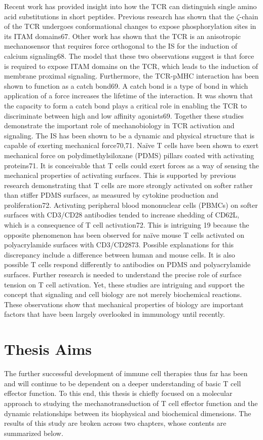 Recent work has provided insight into how the TCR can distinguish
single amino acid substitutions in short peptides. Previous research has
shown that the $\zeta$-chain of the TCR undergoes conformational changes to
expose phosphorylation sites in its ITAM domains67. Other work has shown
that the TCR is an anisotropic mechanosensor that requires force orthogonal
to the IS for the induction of calcium signaling68. The model that these two
observations suggest is that force is required to expose ITAM domains on the
TCR, which leads to the induction of membrane proximal signaling.
Furthermore, the TCR-pMHC interaction has been shown to function as a
catch bond69. A catch bond is a type of bond in which application of a force
increases the lifetime of the interaction. It was shown that the capacity to form
a catch bond plays a critical role in enabling the TCR to discriminate between
high and low affinity agonists69. Together these studies demonstrate the
important role of mechanobiology in TCR activation and signaling.
The IS has been shown to be a dynamic and physical structure that is
capable of exerting mechanical force70,71. Naïve T cells have been shown to
exert mechanical force on polydimethylsiloxane (PDMS) pillars coated with
activating proteins71. It is conceivable that T cells could exert forces as a way
of sensing the mechanical properties of activating surfaces. This is supported
by previous research demonstrating that T cells are more strongly activated on
softer rather than stiffer PDMS surfaces, as measured by cytokine production
and proliferation72. Activating peripheral blood mononuclear cells (PBMCs) on
softer surfaces with CD3/CD28 antibodies tended to increase shedding of
CD62L, which is a consequence of T cell activation72. This is intriguing
19
because the opposite phenomenon has been observed for naïve mouse T
cells activated on polyacrylamide surfaces with CD3/CD2873. Possible
explanations for this discrepancy include a difference between human and
mouse cells. It is also possible T cells respond differently to antibodies on
PDMS and polyacrylamide surfaces. Further research is needed to understand
the precise role of surface tension on T cell activation. Yet, these studies are
intriguing and support the concept that signaling and cell biology are not
merely biochemical reactions. These observations show that mechanical
properties of biology are important factors that have been largely overlooked
in immunology until recently.


\section{Thesis Aims}
The further successful development of immune cell therapies thus far has been and will continue to be dependent on a deeper understanding of basic T cell effector function. To this end, this thesis is chiefly focused on a molecular approach to studying the mechanotransduction of T cell effector function and the dynamic relationships between its biophysical and biochemical dimensions. The results of this study are broken across two chapters, whose contents are summarized below.

